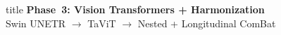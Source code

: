 \documentclass[aspectratio=169,xcolor=dvipsnames]{beamer}
\begin{document}
\begin{frame}[plain]
    \centering
    \vfill
    \begin{beamercolorbox}[center,shadow=true,rounded=true]{title}
        \textbf{Phase~3: Vision Transformers + Harmonization}\\
        \vspace{0.5em}
        \large Swin UNETR $\to$ TaViT $\to$ Nested + Longitudinal ComBat
    \end{beamercolorbox}
    \vfill
\end{frame}

\end{document}
